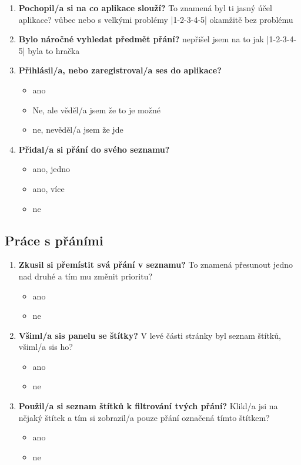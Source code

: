 \begin{enumerate}
\item \textbf{Pochopil/a si na co aplikace slouží?} To znamená byl ti jasný účel aplikace? \newline
		vůbec nebo s velkými problémy |1-2-3-4-5| okamžitě bez problému
\item \textbf{Bylo náročné vyhledat předmět přání?} \newline
		nepřišel jsem na to jak |1-2-3-4-5| byla to hračka
\item \textbf{Přihlásil/a, nebo zaregistroval/a ses do aplikace?}
		\begin{itemize}
		\item ano
		\item Ne, ale věděl/a jsem že to je možné
		\item ne, nevěděl/a jsem že jde
		\end{itemize}
\item \textbf{Přidal/a si přání do svého seznamu?}
		\begin{itemize}
		\item ano, jedno
		\item ano, více
		\item ne
		\end{itemize}
\end{enumerate}

\subsection{Práce s přáními}
\begin{enumerate}
\item \textbf{Zkusil si přemístit svá přání v seznamu?} To znamená přesunout jedno nad druhé a tím mu změnit prioritu?
		\begin{itemize}
		\item ano
		\item ne
		\end{itemize}
\item \textbf{Všiml/a sis panelu se štítky?} V levé části stránky byl seznam štítků, všiml/a sis ho?
		\begin{itemize}
		\item ano
		\item ne
		\end{itemize}
\item \textbf{Použil/a si seznam štítků k filtrování tvých přání?} Klikl/a jsi na nějaký štítek a tím si zobrazil/a pouze přání označená tímto štítkem?
		\begin{itemize}
		\item ano
		\item ne
		\end{itemize}
\end{enumerate}

